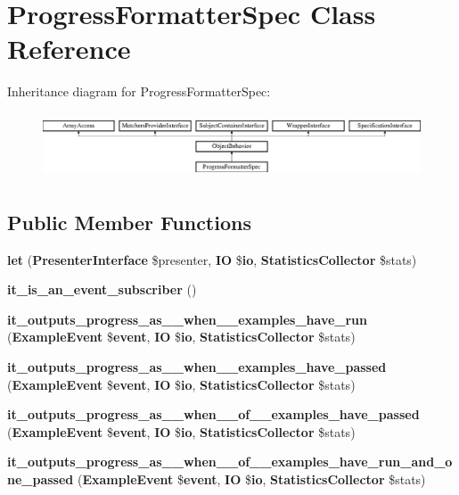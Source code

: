 \section{Progress\+Formatter\+Spec Class Reference}
\label{classspec_1_1_php_spec_1_1_formatter_1_1_progress_formatter_spec}
Inheritance diagram for Progress\+Formatter\+Spec\+:\begin{figure}[H]
\begin{center}
\leavevmode
\includegraphics[height=1.953488cm]{classspec_1_1_php_spec_1_1_formatter_1_1_progress_formatter_spec}
\end{center}
\end{figure}
\subsection*{Public Member Functions}
\begin{DoxyCompactItemize}
\item 
{\bf let} ({\bf Presenter\+Interface} \$presenter, {\bf I\+O} \${\bf io}, {\bf Statistics\+Collector} \$stats)
\item 
{\bf it\+\_\+is\+\_\+an\+\_\+event\+\_\+subscriber} ()
\item 
{\bf it\+\_\+outputs\+\_\+progress\+\_\+as\+\_\+\_\+when\+\_\+\_\+examples\+\_\+have\+\_\+run} ({\bf Example\+Event} \${\bf event}, {\bf I\+O} \${\bf io}, {\bf Statistics\+Collector} \$stats)
\item 
{\bf it\+\_\+outputs\+\_\+progress\+\_\+as\+\_\+\_\+when\+\_\+\_\+examples\+\_\+have\+\_\+passed} ({\bf Example\+Event} \${\bf event}, {\bf I\+O} \${\bf io}, {\bf Statistics\+Collector} \$stats)
\item 
{\bf it\+\_\+outputs\+\_\+progress\+\_\+as\+\_\+\_\+when\+\_\+\_\+of\+\_\+\_\+examples\+\_\+have\+\_\+passed} ({\bf Example\+Event} \${\bf event}, {\bf I\+O} \${\bf io}, {\bf Statistics\+Collector} \$stats)
\item 
{\bf it\+\_\+outputs\+\_\+progress\+\_\+as\+\_\+\_\+when\+\_\+\_\+of\+\_\+\_\+examples\+\_\+have\+\_\+run\+\_\+and\+\_\+one\+\_\+passed} ({\bf Example\+Event} \${\bf event}, {\bf I\+O} \${\bf io}, {\bf Statistics\+Collector} \$stats)
\end{DoxyCompactItemize}
